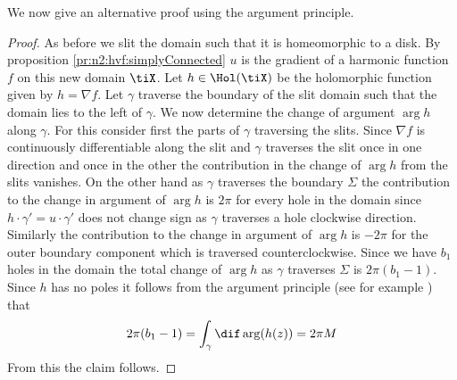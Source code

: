 We now give an alternative proof using the argument principle.
\begin{proof}
  As before we slit the domain such that it is homeomorphic to a disk. By proposition \ref{pr:n2:hvf:simplyConnected} $u$ is the gradient of a
  harmonic function $f$ on this new domain $\tiX$. Let $h\in\Hol(\tiX)$ be the holomorphic function given by $h=\nabla f$.
  Let $\gamma$ traverse the boundary of the slit domain such that the domain lies to the left of $\gamma$.
  We now determine the change of argument $\arg h$ along $\gamma$. For this
  consider first the parts of $\gamma$ traversing the slits. Since $\nabla f$ is continuously differentiable
  along the slit and $\gamma$ traverses the slit once in one direction and once in the other 
  the contribution in the change of $\arg h$ from the slits vanishes.
  On the other hand as $\gamma$ traverses the boundary $\Sigma$ the contribution to the change in
  argument of $\arg h$ is $2\pi$ for every hole in the domain 
  since $h\cdot\gamma'=u\cdot\gamma'$ does not change sign as $\gamma$ traverses a hole clockwise direction.
  Similarly the contribution to the change in argument of $\arg h$ is $-2\pi$ for the outer boundary component
  which is traversed counterclockwise.
  Since we have $b_1$ holes in the domain the total change of $\arg h$ as $\gamma$ traverses $\Sigma$ is
  $2\pi(b_1-1)$.
  Since $h$ has no poles it follows from the argument principle (see for example \cite[Chapter VIII]{Gamelin2001}) that
  \begin{align*}
    2\pi(b_1-1)=\int_\gamma\dif\arg (h(z)) =  2\pi M
  \end{align*}
  From this the claim follows.
\end{proof}

